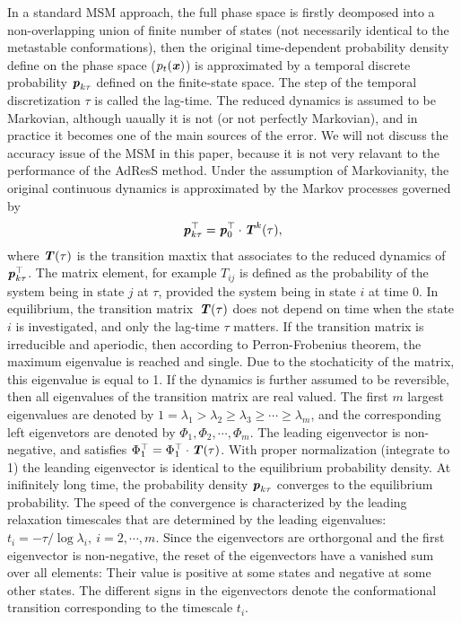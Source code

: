 \documentclass[epjST]{svjour}
\newcommand{\vect}[1]{\textbf{\textit{#1}}}
\begin{document}
In a standard MSM approach, the full phase space is firstly deomposed into a non-overlapping union of finite number of states
(not necessarily identical to the metastable conformations),
then
the original time-dependent probability density define on the phase
space ($p_t(\vect x)$) is approximated by a temporal discrete probability $\vect p_{k\tau}$ defined on the finite-state space.
The step of the temporal discretization $\tau$ is called the lag-time.
The reduced
dynamics is assumed to be Markovian,
although uaually it is not (or not perfectly Markovian),  and in practice it becomes one of the main sources of the error.
We will not discuss the accuracy issue of the MSM in this paper,
because it is not very relavant to the performance of the AdResS method.
Under the assumption of Markovianity, the original continuous dynamics is approximated by the Markov processes governed by
\begin{align}
\vect p^\top_{k\tau} = \vect p^\top_0 \cdot \vect T^k(\tau),
\end{align}
where $\vect T(\tau)$ is the transition maxtix that
associates to the reduced dynamics of $\vect p^\top_{k\tau}$. The matrix element, for example $T_{ij}$
is defined as the probability of the system being in state
$j$ at $\tau$,  provided the system being in state $i$ at time 0.
In equilibrium, the transition matrix~$\vect T(\tau)$ does not depend on time when the state $i$ is investigated, and only the
lag-time $\tau$ matters.
If the transition matrix is irreducible and aperiodic, then according to Perron-Frobenius theorem, the maximum
eigenvalue is reached and single. Due to the stochaticity of the matrix, this eigenvalue is equal to 1.
If the dynamics
is further assumed to be reversible, then all eigenvalues of the transition matrix are
real valued.
The first $m$ largest eigenvalues are denoted by $1 = \lambda_1 > \lambda_2 \geq \lambda_3 \geq \cdots \geq \lambda_m$, and
the corresponding left eigenvetors are denoted by $\Phi_1, \Phi_2, \cdots, \Phi_m$.
The leading eigenvector is non-negative, and satisfies $\Phi^\top_1 = \Phi^\top_1\cdot\vect T(\tau)$.
With proper normalization (integrate to 1) the leanding eigenvector is identical to the 
equilibrium probability density.
At inifinitely long time, the probability density $\vect p_{k\tau}$ converges to the equilibrium probability.
The speed of the convergence is characterized by the leading relaxation timescales that are
determined by the leading eigenvalues:  $t_i  = -{\tau}/{\log\lambda_i}, \ i=2, \cdots, m$.
Since the eigenvectors are orthorgonal and the first eigenvector is non-negative, the reset
of the eigenvectors have a vanished sum over all elements: Their
value is positive at some states and negative at some other states.
The different signs in the eigenvectors denote the conformational transition corresponding to the
timescale $t_i$.
\end{document}
